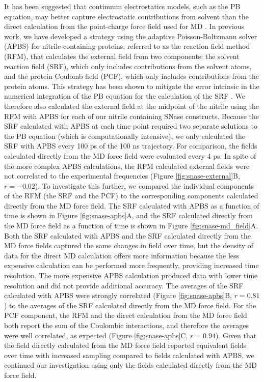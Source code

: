 It has been suggested that continuum electrostatics models, such as the PB equation, may better capture electrostatic contributions from solvent than the direct calculation from the point-charge force field used for MD \cite{Wagoner2004}. 
In previous work, we have developed a strategy using the adaptive Poisson-Boltzmann solver (APBS) for nitrile-containing proteins, referred to as the reaction field method (RFM), that calculates the external field from two components: 
the solvent reaction field (SRF), which only includes contributions from the solvent atoms, and 
the protein Coulomb field (PCF), which only includes contributions from the protein atoms. 
This strategy has been shown to mitigate the error intrinsic in the numerical integration of the PB equation for the calculation of the SRF \cite{Ritchie2013, Ritchie2014, Ritchie2015}. 
We therefore also calculated the external field at the midpoint of the nitrile using the RFM with APBS for each of our nitrile containing SNase constructs. 
Because the SRF calculated with APBS at each time point required two separate solutions to the PB equation (which is computationally intensive), we only calculated the SRF with APBS every 100 ps of the 100 ns trajectory. 
For comparison, the fields calculated directly from the MD force field were evaluated every 4 ps. 
In spite of the more complex APBS calculations, the RFM calculated external fields were not correlated to the experimental frequencies (Figure \ref{fig:snase-external}B, $r = -0.02$). 
To investigate this further, we compared the individual components of the RFM (the SRF and the PCF) to the corresponding components calculated directly from the MD force field. 
The SRF calculated with APBS as a function of time is shown in Figure \ref{fig:snase-apbs}A, and the SRF calculated directly from the MD force field as a function of time is shown in Figure \ref{fig:snase-md_field}A. 
Both the SRF calculated with APBS and the SRF calculated directly from the MD force fields captured the same changes in field over time, but the density of data for the direct MD calculation offers more information because the less expensive calculation can be performed more frequently, providing increased time resolution. 
The more expensive APBS calculation produced data with lower time resolution and did not provide additional accuracy. 
The averages of the SRF calculated with APBS were strongly correlated (Figure \ref{fig:snase-apbs}B, $r = 0.81$) to the averages of the SRF calculated directly from the MD force field. 
For the PCF component, the RFM and the direct calculation from the MD force field both report the sum of the Coulombic interactions, and therefore the averages were well correlated, as expected (Figure \ref{fig:snase-apbs}C, $r = 0.94$). 
Given that the field directly calculated from the MD force field reported equivalent fields over time with increased sampling compared to fields calculated with APBS, we continued our investigation using only the fields calculated directly from the MD force field.

